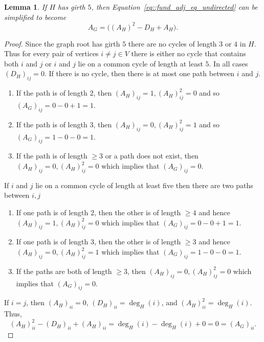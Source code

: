 \documentclass[11pt]{report}
\newtheorem{lemma}{Lemma}
\begin{document}
\begin{lemma} \label{lemma::no_indicator_girth_5}
  If $H$ has girth $5$, then Equation~\eqref{eq::fund_adj_eq_undirected} can be simplified to become 
  \begin{equation} \label{eq::fund_adj_eq_undirected_no_indicator}
    A_G = \big((A_H)^2 - D_H + A_H\big).
  \end{equation}
\end{lemma}
\begin{proof}
  Since the graph root has girth $5$ there are no cycles of length $3$ or $4$ in $H$. Thus for every pair of vertices $i \neq j \in V$ there is either no cycle that contains both $i$ and $j$ or $i$ and $j$ lie on a common cycle of length at least $5$. In all cases $(D_H)_{ij} = 0$. If there is no cycle, then there is at most one path between $i$ and $j$. 
  \begin{enumerate}[label=\roman*)]
    \item If the path is of length $2$, then $(A_H)_{ij} = 1, (A_H)^2_{ij} = 0$ and so $(A_G)_{ij} = 0 - 0 + 1 = 1$.
    \item If the path is of length $3$, then $(A_H)_{ij} = 0, (A_H)^2_{ij} = 1$ and so $(A_G)_{ij} = 1 - 0 - 0 = 1$.
    \item If the path is of length $\geq 3$ or a path does not exist, then $(A_H)_{ij} = 0, (A_H)^2_{ij} = 0$ which implies that $(A_G)_{ij} = 0$.
  \end{enumerate}
  If $i$ and $j$ lie on a common cycle of length at least five then there are two paths between $i,j$
  \begin{enumerate}[label=\roman*)]
    \item If one path is of length $2$, then the other is of length $\geq 4$ and hence $(A_H)_{ij} = 1, (A_H)^2_{ij} = 0$ which implies that $(A_G)_{ij} = 0 - 0 + 1 = 1$.
    \item If one path is of length $3$, then the other is of length $\geq 3$ and hence $(A_H)_{ij} = 0, (A_H)^2_{ij} = 1$ which implies that $(A_G)_{ij} = 1 - 0 - 0 = 1$.
    \item If the paths are both of length $\geq 3$,  then $(A_H)_{ij} = 0, (A_H)^2_{ij} = 0$ which implies that $(A_G)_{ij} = 0$. 
  \end{enumerate}
  If $i = j$, then $(A_H)_{ii} = 0$, $(D_H)_{ii} = \deg_H(i)$, and $(A_H)^2_{ii} = \deg_H(i)$. Thus,
  \[
  (A_H)^2_{ii} - (D_H)_{ii} + (A_H)_{ii} = \deg_H(i) - \deg_H(i) + 0 = 0 = (A_G)_{ii}.
  \]
\end{proof}
\end{document}

